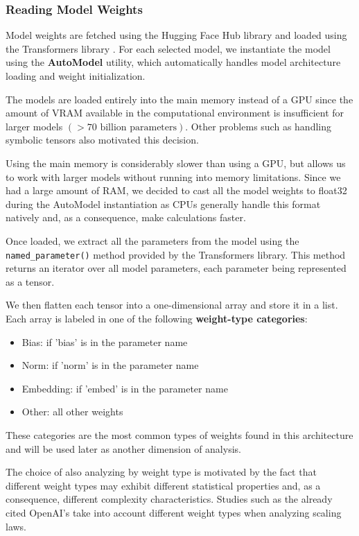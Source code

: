     \subsubsection{Reading Model Weights}

        Model weights are fetched using the Hugging Face Hub library \cite{HuggingFaceHub} and loaded using the Transformers library \cite{Wolf2019}. For each selected model, we instantiate the model using the \textbf{AutoModel} utility, which automatically handles model architecture loading and weight initialization. 

        The models are loaded entirely into the main memory instead of a GPU since the amount of VRAM available in the computational environment is insufficient for larger models $(> 70 \text{ billion parameters})$. Other problems such as handling symbolic tensors also motivated this decision.

        Using the main memory is considerably slower than using a GPU, but allows us to work with larger models without running into memory limitations. Since we had a large amount of RAM, we decided to cast all the model weights to float32 during the AutoModel instantiation as CPUs generally handle this format natively and, as a consequence, make calculations faster.
        
        Once loaded, we extract all the parameters from the model using the \texttt{named\_parameter()} method provided by the Transformers library. This method returns an iterator over all model parameters, each parameter being represented as a tensor. 

        We then flatten each tensor into a one-dimensional array and store it in a list. Each array is labeled in one of the following \textbf{weight-type categories}:
        \begin{itemize}
            \item Bias: if 'bias' is in the parameter name
            \item Norm: if 'norm' is in the parameter name
            \item Embedding: if 'embed' is in the parameter name
            \item Other: all other weights
        \end{itemize}

        These categories are the most common types of weights found in this architecture and will be used later as another dimension of analysis. 
        
        The choice of also analyzing by weight type is motivated by the fact that different weight types may exhibit different statistical properties and, as a consequence, different complexity characteristics. Studies such as the already cited OpenAI's \cite{Kaplan2020} take into account different weight types when analyzing scaling laws.

